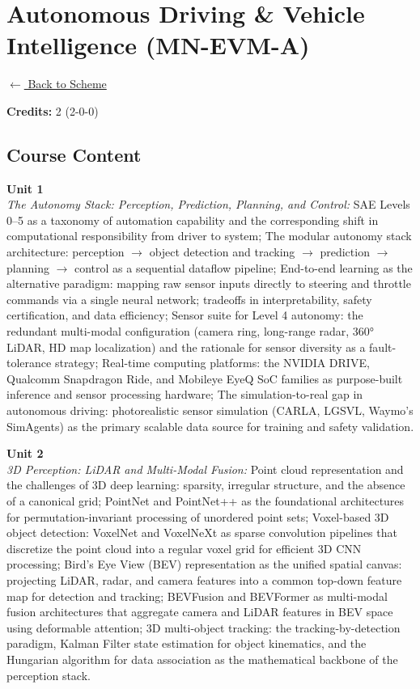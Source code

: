 \section*{Autonomous Driving \& Vehicle Intelligence (MN-EVM-A)}
\label{minor:EVM_L2}

\noindent \small{\hyperref[main:scheme]{$\leftarrow$ Back to Scheme}} \vspace{0.5cm}

\noindent \textbf{Credits:} 2 (2-0-0)

\subsection*{Course Content}
\noindent\textbf{Unit 1} \\
\textit{The Autonomy Stack: Perception, Prediction, Planning, and Control:} SAE Levels 0--5 as a taxonomy of automation capability and the corresponding shift in computational responsibility from driver to system; The modular autonomy stack architecture: perception $\rightarrow$ object detection and tracking $\rightarrow$ prediction $\rightarrow$ planning $\rightarrow$ control as a sequential dataflow pipeline; End-to-end learning as the alternative paradigm: mapping raw sensor inputs directly to steering and throttle commands via a single neural network; tradeoffs in interpretability, safety certification, and data efficiency; Sensor suite for Level 4 autonomy: the redundant multi-modal configuration (camera ring, long-range radar, 360° LiDAR, HD map localization) and the rationale for sensor diversity as a fault-tolerance strategy; Real-time computing platforms: the NVIDIA DRIVE, Qualcomm Snapdragon Ride, and Mobileye EyeQ SoC families as purpose-built inference and sensor processing hardware; The simulation-to-real gap in autonomous driving: photorealistic sensor simulation (CARLA, LGSVL, Waymo's SimAgents) as the primary scalable data source for training and safety validation.

\vspace{0.3cm}

\noindent\textbf{Unit 2} \\
\textit{3D Perception: LiDAR and Multi-Modal Fusion:} Point cloud representation and the challenges of 3D deep learning: sparsity, irregular structure, and the absence of a canonical grid; PointNet and PointNet++ as the foundational architectures for permutation-invariant processing of unordered point sets; Voxel-based 3D object detection: VoxelNet and VoxelNeXt as sparse convolution pipelines that discretize the point cloud into a regular voxel grid for efficient 3D CNN processing; Bird's Eye View (BEV) representation as the unified spatial canvas: projecting LiDAR, radar, and camera features into a common top-down feature map for detection and tracking; BEVFusion and BEVFormer as multi-modal fusion architectures that aggregate camera and LiDAR features in BEV space using deformable attention; 3D multi-object tracking: the tracking-by-detection paradigm, Kalman Filter state estimation for object kinematics, and the Hungarian algorithm for data association as the mathematical backbone of the perception stack.

